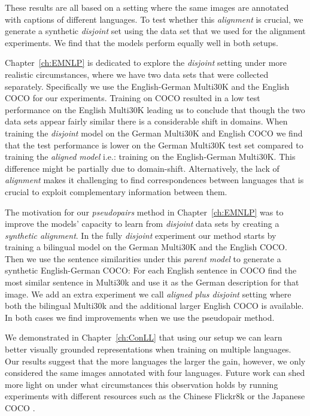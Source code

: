 These results are all based on a setting where the same images are annotated with captions 
 of different languages. To test whether this \emph{alignment} is crucial, we generate
 a synthetic \emph{disjoint} set using the data set that we used for the alignment experiments. We find
 that the models perform equally well in both setups.

Chapter~\ref{ch:EMNLP} is dedicated to explore the \emph{disjoint} setting under more realistic 
circumstances, where we have two data sets that were collected separately. 
Specifically we use the English-German Multi30K and the English COCO for our experiments.
Training on COCO resulted in a low test performance on the English Multi30K leading us to  conclude that 
though the two data sets appear fairly similar there is a considerable shift in domains. When training
the \emph{disjoint} model on the German Multi30K and English COCO we find that the test performance
is lower on the German Multi30K test set compared to training the \emph{aligned model} i.e.: training
on the English-German Multi30K. This difference might be partially due to domain-shift. Alternatively,
the lack of \emph{alignment} makes it challenging to find correspondences between languages that
is crucial to exploit complementary information between them.

The motivation for our \emph{pseudopairs} method in Chapter~\ref{ch:EMNLP} 
was to improve the models' capacity to learn from \emph{disjoint} data sets by 
creating a \emph{synthetic alignment}. In the fully \emph{disjoint} experiment our method
starts by training a bilingual model on the German Multi30K and the English COCO. Then we 
use the sentence similarities under this \emph{parent model} to generate a synthetic 
English-German COCO: For each English sentence in COCO find the most similar sentence in Multi30k
and use it as the German description for that image. We add an extra experiment we call \emph{aligned
plus disjoint} setting where both the bilingual Multi30k and the additional larger English COCO is available.
In both cases we find improvements when we use the pseudopair method.

We demonstrated in Chapter~\ref{ch:ConLL} that using our setup we can learn better 
visually grounded representations when training on multiple languages. Our results suggest that the
more languages the larger the gain, however, we only considered the same images annotated with 
four languages. Future work can shed more light on under what circumstances this observation holds
by running experiments with different resources such as the Chinese Flickr8k \citep{li2016adding}
or the Japanese COCO \citep{P16-1168}. 

